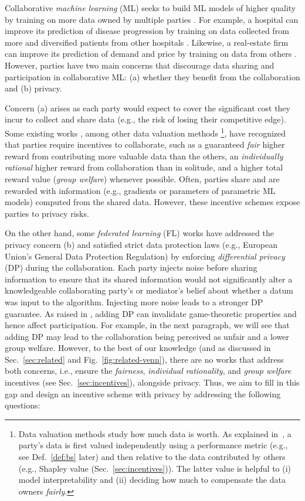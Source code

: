 Collaborative \emph{machine learning} (ML) seeks to build ML models of higher quality by training on more data owned by multiple parties \cite{simcollaborative,yang2019federated}. For example, a hospital can improve its prediction of disease progression by training on data collected from more and diversified patients from other hospitals \cite{share-health}. Likewise, a real-estate firm can improve its prediction of demand and price by training on data from others \cite{share-real-estate}.  However, parties have two main concerns that discourage data sharing and participation in collaborative ML: (a) whether they benefit from the collaboration and (b) privacy.

Concern (a) arises as each party would expect to cover the significant cost they incur to collect and share data (e.g., the risk of losing their competitive edge).
Some existing works \cite{simcollaborative,tay2021}, among other data valuation methods \footnote{Data valuation methods study how much data is worth. As explained in~\citet{sim2022data}, a party's data is first valued independently using a performance metric (e.g., see Def.~\ref{def:bs} later) and then relative to the data contributed by others (e.g., Shapley value (Sec.~\ref{sec:incentives})). The latter value is helpful to (i) model interpretability and (ii) deciding how much to compensate the data owners \emph{fairly}.}, have recognized that parties require incentives to collaborate, such as a guaranteed \emph{fair} higher reward from contributing more valuable data than the others, an \emph{individually rational} higher reward from collaboration than in solitude, and a higher total reward value (\emph{group welfare}) whenever possible. Often, parties share and are rewarded with information (e.g., gradients \cite{xu2021gradient} or parameters \cite{simcollaborative} of parametric ML models) computed from the shared data. However, these incentive schemes expose parties to privacy risks.

On the other hand, some \emph{federated learning} (FL) works  \cite{mcmahan2017seminalFL} have addressed the privacy concern (b) and satisfied strict data protection laws (e.g., European Union's General Data Protection Regulation) by enforcing \emph{differential privacy} (DP) \cite{abadi2016deep,mcmahan2017learning} during the collaboration. Each party injects noise before sharing information to ensure that its shared information would not significantly alter a knowledgeable collaborating party's or mediator's belief about whether a datum was input to the algorithm. Injecting more noise leads to a stronger DP guarantee.
As raised in \citet{Yu21}, adding DP can invalidate game-theoretic properties and hence affect participation. For example, in the next paragraph, we will see that adding DP may lead to the collaboration being perceived as unfair and a lower group welfare.
However, to the best of our knowledge (and as discussed in Sec.~\ref{sec:related} and Fig.~\ref{fig:related-venn}), there are no works that address both concerns, i.e., ensure the \emph{fairness}, \emph{individual rationality}, and \emph{group welfare} incentives (see Sec.~\ref{sec:incentives}), alongside privacy.
Thus, we aim to fill in this gap and design an incentive scheme with privacy by addressing the following questions:
